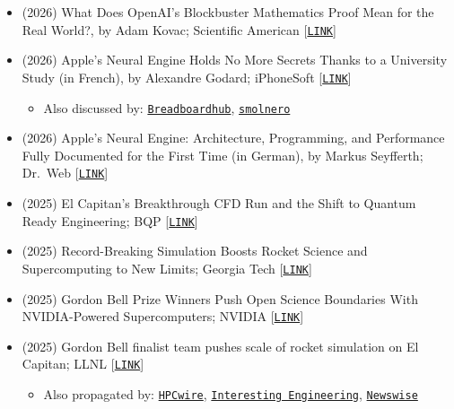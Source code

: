 \begin{itemize}
    \item (2026) What Does OpenAI's Blockbuster Mathematics Proof Mean for the Real World?, by Adam Kovac; Scientific American [\href{https://www.scientificamerican.com/article/what-does-openais-blockbuster-mathematics-navier-stokes-proof-mean-for-the-real-world/}{\tt LINK}]

    \item (2026) Apple's Neural Engine Holds No More Secrets Thanks to a University Study (in French), by Alexandre Godard; iPhoneSoft [\href{https://iphonesoft.fr/2026/08/06/neural-engine-apple-plus-secrets-etude-universitaire}{\tt LINK}]
    \begin{itemize}
        \item Also discussed by: \href{https://www.breadboardhub.com/news/apple-neural-engine-reverse-engineered-architecture-guide}{\tt Breadboardhub}, \href{https://smolnero.com/posts/between-the-graph-and-the-silicon-inside-the-apple-neural-engine-compiler}{\tt smolnero}
    \end{itemize}

    \item (2026) Apple's Neural Engine: Architecture, Programming, and Performance Fully Documented for the First Time (in German), by Markus Seyfferth; Dr.~Web [\href{https://www.drweb.de/apples-neural-engine-architektur-programmierung-und-performance-erstmals-vollstaendig-dokumentiert/}{\tt LINK}]

    \item (2025) El Capitan’s Breakthrough CFD Run and the Shift to Quantum Ready Engineering; BQP [\href{https://www.bqpsim.com/blogs/el-capitans-breakthrough-cfd}{\tt LINK}]

    \item (2025) Record-Breaking Simulation Boosts Rocket Science and Supercomputing to New Limits; Georgia Tech [\href{https://www.cc.gatech.edu/news/record-breaking-simulation-boosts-rocket-science-and-supercomputing-new-limits}{\tt LINK}]

    \item (2025) Gordon Bell Prize Winners Push Open Science Boundaries With NVIDIA-Powered Supercomputers; NVIDIA [\href{https://blogs.nvidia.com/blog/gordon-bell-finalists-2025/}{\tt LINK}] 

    \item (2025) Gordon Bell finalist team pushes scale of rocket simulation on El Capitan; LLNL [\href{https://www.llnl.gov/article/53626/gordon-bell-finalist-team-pushes-scale-rocket-simulation-el-capitan}{\tt LINK}]
    \begin{itemize}
        \item Also propagated by: \href{https://www.hpcwire.com/off-the-wire/llnl-gordon-bell-finalist-team-pushes-scale-of-rocket-simulation-on-el-capitan/}{\tt HPCwire}, \href{https://interestingengineering.com/science/fluid-dynamics-simulation-supercomputer-rocket-exhaust}{\tt Interesting Engineering}, \href{https://www.newswise.com/articles/gordon-bell-finalist-team-pushes-scale-of-rocket-simulation-on-el-capitan}{\tt Newswise}
    \end{itemize}
    

\end{itemize}
